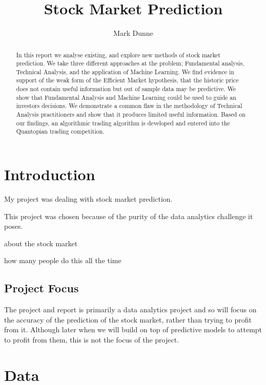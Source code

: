 \documentclass{report}
\title{Stock Market Prediction}
\author{Mark Dunne}
\begin{document}
\maketitle

\begin{abstract}

In this report we analyse existing, and explore new methods of stock market prediction. We take three different approaches at the problem; Fundamental analysis, Technical Analysis, and the application of Machine Learning. We find evidence in support of the weak form of the Efficient Market hypothesis, that the historic price does not contain useful information but out of sample data may be predictive. We show that Fundamental Analysis and Machine Learning could be used to guide an investors decisions. We demonstrate a common flaw in the methodology of Technical Analysis practitioners and show that it produces limited useful information. Based on our findings, an algorithmic trading algorithm is developed and entered into the Quantopian trading competition.

\end{abstract}

\tableofcontents

\chapter{Introduction}

My project was dealing with stock market prediction.

This project was chosen because of the purity of the data analytics challenge it poses.

about the stock market

how many people do this all the time

\section{Project Focus}

The project and report is primarily a data analytics project and so will focus on the accuracy of the prediction of the stock market, rather than trying to profit from it. Although later when we will build on top of predictive models to attempt to profit from them, this is not the focus of the project.

\chapter{Data}
\end{document}
